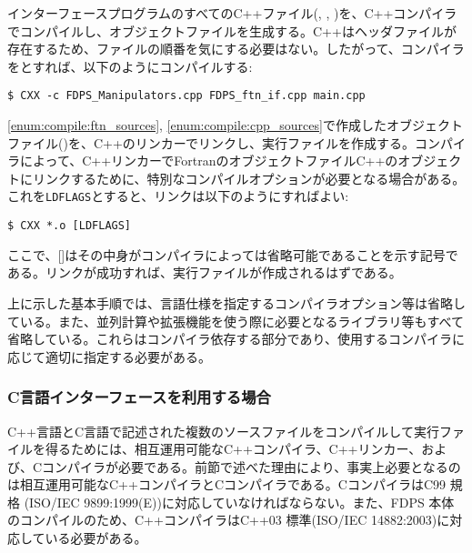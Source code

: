 \begin{enumerate}[leftmargin=*,label={[\arabic*]}]
 インターフェースプログラムのすべてのC++ファイル(, , )を、C++コンパイラでコンパイルし、オブジェクトファイルを生成する。C++はヘッダファイルが存在するため、ファイルの順番を気にする必要はない。したがって、コンパイラをとすれば、以下のようにコンパイルする:
\begin{Verbatim}[commandchars=\\\{\}]
$ CXX -c FDPS_Manipulators.cpp FDPS_ftn_if.cpp main.cpp
\end{Verbatim}
\label{enum:compile:cpp_sources}

 \ref{enum:compile:ftn_sources}, \ref{enum:compile:cpp_sources}で作成したオブジェクトファイル()を、C++のリンカーでリンクし、実行ファイルを作成する。コンパイラによって、C++リンカーでFortranのオブジェクトファイルC++のオブジェクトにリンクするために、特別なコンパイルオプションが必要となる場合がある。これを\verb|LDFLAGS|とすると、リンクは以下のようにすればよい:
\begin{Verbatim}[commandchars=\\\{\}]
$ CXX *.o [LDFLAGS]
\end{Verbatim}
ここで、[]はその中身がコンパイラによっては省略可能であることを示す記号である。リンクが成功すれば、実行ファイルが作成されるはずである。
\end{enumerate}

上に示した基本手順では、言語仕様を指定するコンパイラオプション等は省略している。また、並列計算や拡張機能を使う際に必要となるライブラリ等もすべて省略している。これらはコンパイラ依存する部分であり、使用するコンパイラに応じて適切に指定する必要がある。

\subsubsection{C言語インターフェースを利用する場合}
C++言語とC言語で記述された複数のソースファイルをコンパイルして実行ファイルを得るためには、相互運用可能なC++コンパイラ、C++リンカー、および、Cコンパイラが必要である。前節で述べた理由により、事実上必要となるのは相互運用可能なC++コンパイラとCコンパイラである。CコンパイラはC99 規格 (ISO/IEC 9899:1999(E))に対応していなければならない。また、FDPS 本体のコンパイルのため、C++コンパイラはC++03 標準(ISO/IEC 14882:2003)に対応している必要がある。

